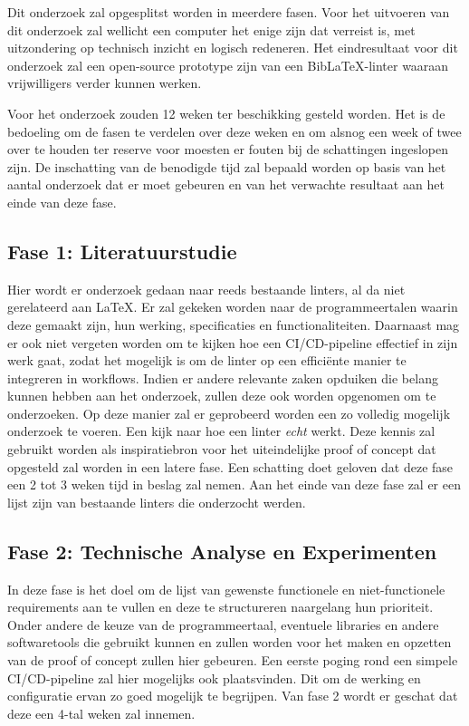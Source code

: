 Dit onderzoek zal opgesplitst worden in meerdere fasen. Voor het uitvoeren van dit onderzoek zal wellicht een computer het enige zijn dat verreist is, met uitzondering op technisch inzicht en logisch redeneren.
Het eindresultaat voor dit onderzoek zal een open-source prototype zijn van een BibLaTeX-linter waaraan vrijwilligers verder kunnen werken. \newline

Voor het onderzoek zouden 12 weken ter beschikking gesteld worden. Het is de bedoeling om de fasen te verdelen over deze weken en om alsnog een week of twee over te houden ter 
reserve voor moesten er fouten bij de schattingen ingeslopen zijn.
De inschatting van de benodigde tijd zal bepaald worden op basis van het aantal onderzoek dat er moet gebeuren en van het verwachte resultaat aan het einde van deze fase. 

\subsection{Fase 1: Literatuurstudie}
Hier wordt er onderzoek gedaan naar reeds bestaande linters, al da niet gerelateerd aan LaTeX. Er zal gekeken worden naar de programmeertalen waarin deze gemaakt zijn, hun werking, specificaties en functionaliteiten. Daarnaast mag er ook niet vergeten worden om te kijken hoe een CI/CD-pipeline effectief in zijn werk gaat, zodat het mogelijk is om de linter op een efficiënte manier te integreren in workflows.
Indien er andere
 relevante zaken opduiken die belang kunnen hebben aan het onderzoek, zullen deze ook worden opgenomen om te onderzoeken. Op deze manier zal er geprobeerd worden een zo volledig mogelijk onderzoek te voeren. 
Een kijk naar hoe een linter \emph{echt} werkt. Deze kennis zal gebruikt worden als inspiratiebron voor het uiteindelijke proof of concept dat opgesteld zal worden in een latere fase. Een schatting doet geloven dat deze fase een 2 
tot 3 weken tijd in beslag zal nemen. Aan het einde van deze fase zal er een lijst zijn van bestaande linters die onderzocht werden.

\subsection{Fase 2: Technische Analyse en Experimenten}
In deze fase is het doel om de lijst van gewenste functionele en niet-functionele requirements aan te vullen en deze te structureren naargelang hun prioriteit. Onder andere de keuze van de programmeertaal, eventuele libraries en andere softwaretools die gebruikt kunnen en zullen worden voor het maken en opzetten 
van de proof of concept zullen hier gebeuren. Een eerste poging rond een simpele CI/CD-pipeline zal hier mogelijks ook plaatsvinden. Dit om de werking en configuratie ervan zo goed mogelijk te begrijpen. Van fase 2 wordt er geschat dat deze een 4-tal weken zal innemen.

